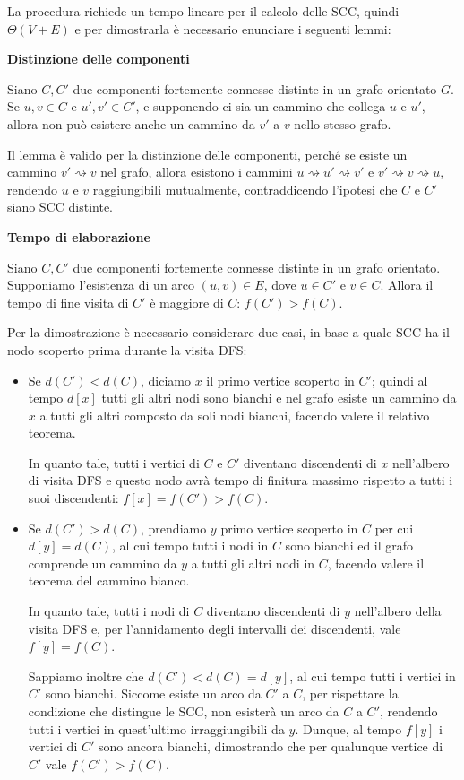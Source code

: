 \noindent La procedura richiede un tempo lineare per il calcolo delle SCC, quindi $\Theta(V+E)$ e per dimostrarla è necessario enunciare i seguenti lemmi: \begin{lemma}
	\textbf{Distinzione delle componenti}\par
	\noindent Siano $C, C'$ due componenti fortemente connesse distinte in un grafo orientato $G$. Se $u,v\in C$ e $u',v'\in C'$, e supponendo ci sia un cammino che collega $u$ e $u'$, allora non può esistere anche un cammino da $v'$ a $v$ nello stesso grafo.
\end{lemma}
\noindent Il lemma è valido per la distinzione delle componenti, perché se esiste un cammino $v'\rightsquigarrow v$ nel grafo, allora esistono i cammini $u\rightsquigarrow u'\rightsquigarrow v'$ e $v'\rightsquigarrow v\rightsquigarrow u$, rendendo $u$ e $v$ raggiungibili mutualmente, contraddicendo l'ipotesi che $C$ e $C'$ siano SCC distinte.
\begin{lemma}
	\textbf{Tempo di elaborazione}\par
	\noindent Siano $C, C'$ due componenti fortemente connesse distinte in un grafo orientato. Supponiamo l'esistenza di un arco $(u,v)\in E$, dove $u\in C'$ e $v\in C$. Allora il tempo di fine visita di $C'$ è maggiore di $C$: $f(C') > f(C)$.
\end{lemma}
\noindent Per la dimostrazione è necessario considerare due casi, in base a quale SCC ha il nodo scoperto prima durante la visita DFS: \begin{itemize}
	\item Se $d(C') < d(C)$, diciamo $x$ il primo vertice scoperto in $C'$; quindi al tempo $d[x]$ tutti gli altri nodi sono bianchi e nel grafo esiste un cammino da $x$ a tutti gli altri composto da soli nodi bianchi, facendo valere il relativo teorema.\par
	In quanto tale, tutti i vertici di $C$ e $C'$ diventano discendenti di $x$ nell'albero di visita DFS e questo nodo avrà tempo di finitura massimo rispetto a tutti i suoi discendenti: $f[x] = f(C') > f(C)$.
	\item Se $d(C') > d(C)$, prendiamo $y$ primo vertice scoperto in $C$ per cui $d[y] = d(C)$, al cui tempo tutti i nodi in $C$ sono bianchi ed il grafo comprende un cammino da $y$ a tutti gli altri nodi in $C$, facendo valere il teorema del cammino bianco.\par
	In quanto tale, tutti i nodi di $C$ diventano discendenti di $y$ nell'albero della visita DFS e, per l'annidamento degli intervalli dei discendenti, vale $f[y] = f(C)$.\par
	Sappiamo inoltre che $d(C') < d(C) = d[y]$, al cui tempo tutti i vertici in $C'$ sono bianchi. Siccome esiste un arco da $C'$ a $C$, per rispettare la condizione che distingue le SCC, non esisterà un arco da $C$ a $C'$, rendendo tutti i vertici in quest'ultimo irraggiungibili da $y$. Dunque, al tempo $f[y]$ i vertici di $C'$ sono ancora bianchi, dimostrando che per qualunque vertice di $C'$ vale $f(C') > f(C)$.
\end{itemize}
